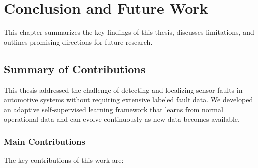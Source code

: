 \chapter{Conclusion and Future Work}
\label{chap:conclusion}

This chapter summarizes the key findings of this thesis, discusses limitations, and outlines promising directions for future research.

\section{Summary of Contributions}

This thesis addressed the challenge of detecting and localizing sensor faults in automotive systems without requiring extensive labeled fault data. We developed an adaptive self-supervised learning framework that learns from normal operational data and can evolve continuously as new data becomes available.

\subsection{Main Contributions}

The key contributions of this work are:

